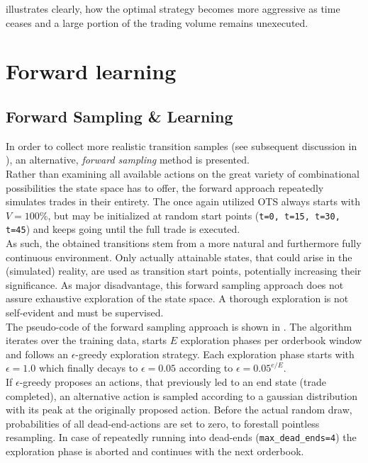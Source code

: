  illustrates clearly, how the optimal strategy becomes more aggressive as time ceases and a large portion of the trading volume remains unexecuted.




\section{Forward learning}
\label{chap:forwardlearning}

\subsection{Forward Sampling \& Learning}
In order to collect more realistic transition samples (see subsequent discussion in ), an alternative, \emph{forward sampling} method is presented.\\

Rather than examining all available actions on the great variety of combinational possibilities the state space has to offer, the forward approach repeatedly simulates trades in their entirety. The once again utilized \ac{OTS} always starts with $V=100\%$, but may be initialized at random start points (\eg \lstinline!t=0, t=15, t=30, t=45!) and keeps going until the full trade is executed.\\

As such, the obtained transitions stem from a more natural and furthermore fully continuous environment. Only actually attainable states, that could arise in the (simulated) reality, are used as transition start points, potentially increasing their significance. As major disadvantage, this forward sampling approach does not assure exhaustive exploration of the state space. A thorough exploration is not self-evident and must be supervised.\\

The pseudo-code of the forward sampling approach is shown in . The algorithm iterates over the training data, starts $E$ exploration phases per orderbook window and follows an $\epsilon$-greedy exploration strategy. Each exploration phase starts with $\epsilon=1.0$ which finally decays to $\epsilon=0.05$ according to $\epsilon=0.05^{e/E}$.\\

If $\epsilon$-greedy proposes an actions, that previously led to an end state (\ie trade completed), an alternative action is sampled according to a gaussian distribution with its peak at the originally proposed action. Before the actual random draw, probabilities of all dead-end-actions are set to zero, to forestall pointless resampling. In case of repeatedly running into dead-ends (\eg \lstinline!max_dead_ends=4!) the exploration phase is aborted and continues with the next orderbook.\\

